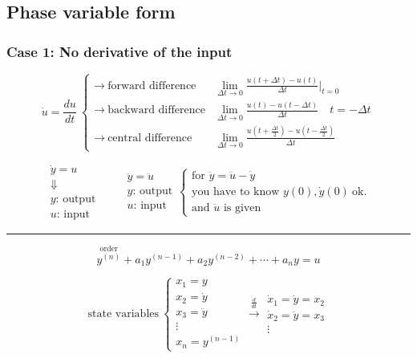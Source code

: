 \documentclass[11pt,a4paper]{article}
\begin{document}
\subsection{Phase variable form}

\subsubsection{Case 1: No derivative of the input}

\[
\dot{u}=\frac{du}{dt}\ \left\{\begin{array}{ll}
\to\ \text{forward difference} & \displaystyle\lim_{\Delta t\to 0}\frac{u(t+\Delta t)-u(t)}{\Delta t}\Big|_{t=0}\\[2.5ex]
\to\ \text{backward difference} & \displaystyle\lim_{\Delta t\to 0}\frac{u(t)-u(t-\Delta t)}{\Delta t}\quad t=-\Delta t\\[2.5ex]
\to\ \text{central difference} & \displaystyle\lim_{\Delta t\to 0}\frac{u\!\left(t+\frac{\Delta t}{2}\right)-u\!\left(t-\frac{\Delta t}{2}\right)}{\Delta t}
\end{array}\right.
\]

\[
\begin{array}{l}\dot{y}=u\\ \Downarrow\\ y\text{: output}\\ u\text{: input}\end{array}
\qquad
\begin{array}{l}\ddot{y}=\ddot{u}\\ y\text{: output}\\ u\text{: input}\end{array}
\left\{\begin{array}{l}
\text{for } \ddot{y}=\ddot{u}-\dot{y}\\
\text{you have to know } y(0),\dot{y}(0)\ \text{ok.}\\
\text{and } \ddot{u}\text{ is given}
\end{array}\right.
\]

\medskip\hrule\medskip

\[
\overset{\text{order}}{y^{(n)}}+a_1y^{(n-1)}+a_2y^{(n-2)}+\cdots+a_ny=u
\]

\[
\text{state variables}\ \left\{\begin{array}{l}x_1=y\\x_2=\dot{y}\\x_3=\ddot{y}\\ \vdots\\ x_n=y^{(n-1)}\end{array}\right.
\xrightarrow{\ \frac{d}{dt}\ }
\begin{array}{l}\dot{x}_1=\dot{y}=x_2\\ \dot{x}_2=\ddot{y}=x_3\\ \vdots\end{array}
\]
\end{document}
